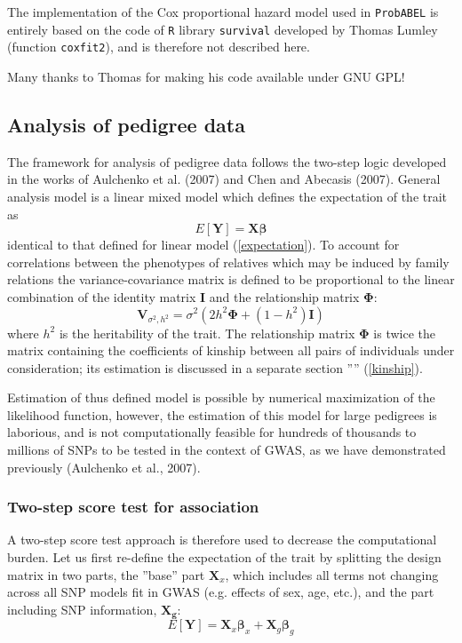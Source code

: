 \documentclass[12pt]{article}
\begin{document}
The implementation of the Cox proportional hazard model used 
in \texttt{ProbABEL} is entirely based on the code of \texttt{R} 
library \texttt{survival} developed by Thomas Lumley 
(function \texttt{coxfit2}), and is therefore not described here. 

Many thanks to Thomas for making his code available under GNU GPL!

\subsection{Analysis of pedigree data}

The framework for analysis of pedigree data follows the two-step 
logic developed in the works of Aulchenko et al. (2007) and Chen and Abecasis
(2007). General analysis model is a linear mixed model which defines the
expectation of the trait as 
$$
E[\mathbf{Y}] = \mathbf{X} \mathbf{\beta}
$$
identical to that defined for linear model (\ref{expectation}).
To account for correlations between the phenotypes of
relatives which may be induced by family relations the variance-covariance 
matrix is defined to be proportional to the linear combination of the
identity matrix $\mathbf{I}$ and the relationship matrix $\mathbf{\Phi}$: 
$$
\mathbf{V}_{\sigma^2,h^2} = \sigma^2 (2 h^2 \mathbf{\Phi} + (1-h^2) \mathbf{I})
$$
where $h^2$ is the heritability of the trait. 
The relationship matrix $\mathbf{\Phi}$ is twice the matrix containing 
the coefficients of kinship between all pairs of individuals under consideration; 
its estimation is discussed in a separate section '''' (\ref{kinship}).

Estimation of thus defined model is possible by numerical maximization of the
likelihood function, however, the estimation of this model 
for large pedigrees is laborious, and is not computationally feasible for
hundreds of thousands to millions of SNPs to be tested in the context of GWAS,
as we have demonstrated previously (Aulchenko et al., 2007).

\subsubsection{Two-step score test for association}

A two-step score test approach is therefore used to decrease the computational
burden. Let us first re-define the expectation of the trait by splitting the 
design matrix in two parts, the ''base'' part $\mathbf{X}_x$, which includes all 
terms not changing across all SNP models fit in GWAS (e.g. effects of sex, age, etc.), 
and the part including SNP information, $\mathbf{X_g}$:
$$
E[\mathbf{Y}] = \mathbf{X}_x \mathbf{\beta}_x + \mathbf{X}_g \mathbf{\beta}_g
$$
\end{document}
